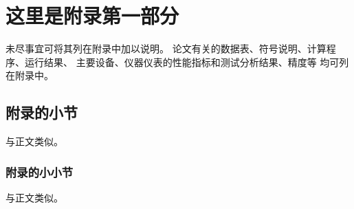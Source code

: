 \chapter{这里是附录第一部分}\label{app:1}
未尽事宜可将其列在附录中加以说明。
论文有关的数据表、符号说明、计算程序、运行结果、
主要设备、仪器仪表的性能指标和测试分析结果、精度等
均可列在附录中。
\section{附录的小节}
与正文类似。
    \subsection{附录的小小节}
    与正文类似。